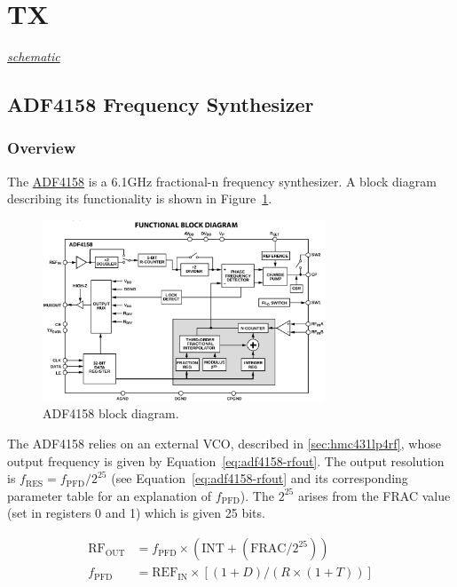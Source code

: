 \section{TX}
\label{sec:tx}
\textit{\hyperlink{schematic.5}{schematic}}

\subsection{ADF4158 Frequency Synthesizer}
\label{sec:adf4158-freq-synth}

\subsubsection{Overview}
\label{sec:adf4158-overview}

The \href{http://www.analog.com/media/en/technical-documentation/data-sheets/ADF4158.pdf}{ADF4158}
is a 6.1GHz fractional-n frequency synthesizer. A block diagram describing its functionality is shown in
Figure~\ref{fig:adf4158-block-diagram}.

\begin{figure}[h]
  \centering
  \includegraphics[width=0.75\textwidth]{data/adf4158-block-diagram.png}
  \caption{ADF4158 block diagram.}
  \label{fig:adf4158-block-diagram}
\end{figure}

The ADF4158 relies on an external VCO, described in \cref{sec:hmc431lp4rf}, whose output frequency
is given by Equation~\ref{eq:adf4158-rfout}. The output resolution is
$f_{\text{RES}} = f_{\text{PFD}}/2^{25}$ (see Equation~\ref{eq:adf4158-rfout} and its corresponding
parameter table for an explanation of $f_{\text{PFD}}$). The $2^{25}$ arises from the FRAC value
(set in registers 0 and 1) which is given 25 bits.

\begin{align}
  \text{RF}_{\text{OUT}} &= f_{\text{PFD}} \times \left(\text{INT} +
                           \left(\text{FRAC}/2^{25}\right)\right) \label{eq:adf4158-rfout} \\
  f_{\text{PFD}} &= \text{REF}_{\text{IN}} \times \left[\left(1 + D\right)/\left(R\times \left(1 +
                   T\right)\right) \right] \nonumber
\end{align}

